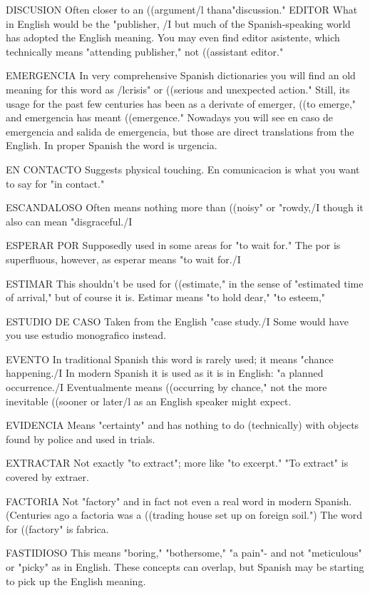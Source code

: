 DISCUSION Often closer to an ((argument/l thana"discussion."
EDITOR What in English would be the "publisher, /I but much
of the Spanish-speaking world has adopted the English meaning. You
may even find editor asistente, which technically means "attending
publisher," not ((assistant editor."

EMERGENCIA In very comprehensive Spanish dictionaries
you will find an old meaning for this word as /lcrisis" or ((serious and
unexpected action." Still, its usage for the past few centuries has been
as a derivate of emerger, ((to emerge," and emergencia has meant
((emergence." Nowadays you will see en caso de emergencia and salida de emergencia, but those are direct translations from the English.
In proper Spanish the word is urgencia.

EN CONTACTO Suggests physical touching. En comunicacion
is what you want to say for "in contact."

ESCANDALOSO Often means nothing more than ((noisy" or
"rowdy,/I though it also can mean "disgraceful./I

ESPERAR POR Supposedly used in some areas for "to wait
for." The por is superfluous, however, as esperar means "to wait for./I

ESTIMAR This shouldn't be used for ((estimate," in the sense
of "estimated time of arrival," but of course it is. Estimar means "to
hold dear," "to esteem,"

ESTUDIO DE CASO Taken from the English "case study./I
Some would have you use estudio monografico instead.

EVENTO In traditional Spanish this word is rarely used; it
means "chance happening./I In modern Spanish it is used as it is in
English: "a planned occurrence./I Eventualmente means ((occurring
by chance," not the more inevitable ((sooner or later/l as an English
speaker might expect.

EVIDENCIA Means "certainty" and has nothing to do (technically) with objects found by police and used in trials.

EXTRACTAR Not exactly "to extract"; more like "to excerpt."
"To extract" is covered by extraer.

FACTORIA Not "factory" and in fact not even a real word in
modern Spanish. (Centuries ago a factoria was a ((trading house set up
on foreign soil.") The word for ((factory" is fabrica.

FASTIDIOSO This means "boring," "bothersome," "a pain"-
and not "meticulous" or "picky" as in English. These concepts can
overlap, but Spanish may be starting to pick up the English meaning.

